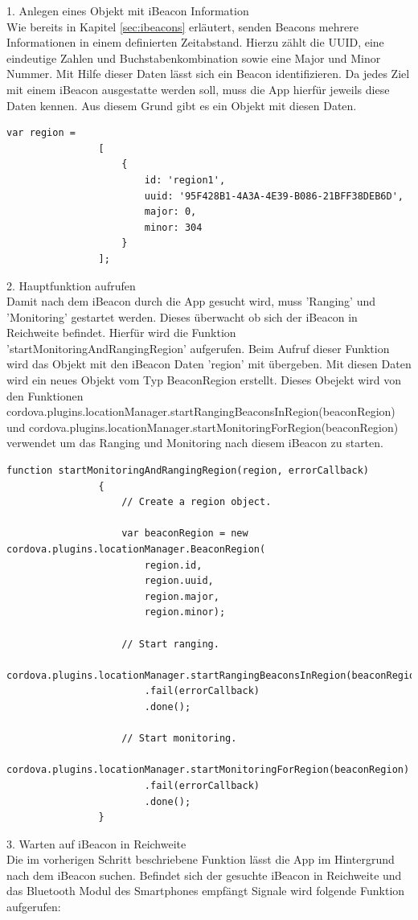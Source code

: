 1. Anlegen eines Objekt mit iBeacon Information
\\Wie bereits in Kapitel \ref{sec:ibeacons} erläutert, senden Beacons mehrere Informationen in einem definierten Zeitabstand. Hierzu zählt die UUID, eine eindeutige Zahlen und Buchstabenkombination sowie eine Major und Minor Nummer. Mit Hilfe dieser Daten lässt sich ein Beacon identifizieren. Da jedes Ziel mit einem iBeacon ausgestatte werden soll, muss die App hierfür jeweils diese Daten kennen. Aus diesem Grund gibt es ein Objekt mit diesen Daten.
 
\begin{lstlisting}
var region =
				[
					{
						id: 'region1',
						uuid: '95F428B1-4A3A-4E39-B086-21BFF38DEB6D',
						major: 0,
						minor: 304
					}
				];
\end{lstlisting}


2. Hauptfunktion aufrufen
\\Damit nach dem iBeacon durch die App gesucht wird, muss 'Ranging' und 'Monitoring' gestartet werden. Dieses überwacht ob sich der iBeacon in Reichweite befindet. Hierfür wird die Funktion 'startMonitoringAndRangingRegion' aufgerufen. Beim Aufruf dieser Funktion wird das Objekt mit den iBeacon Daten 'region' mit übergeben. Mit diesen Daten wird ein neues Objekt vom Typ BeaconRegion erstellt. Dieses Obejekt wird von den Funktionen  cordova.plugins.locationManager.startRangingBeaconsInRegion(beaconRegion) und cordova.plugins.locationManager.startMonitoringForRegion(beaconRegion) verwendet um das Ranging und Monitoring nach diesem iBeacon zu starten.

\begin{lstlisting}
function startMonitoringAndRangingRegion(region, errorCallback)
				{
					// Create a region object.
					
					var beaconRegion = new cordova.plugins.locationManager.BeaconRegion(
						region.id,
						region.uuid,
						region.major,
						region.minor);

					// Start ranging.
					cordova.plugins.locationManager.startRangingBeaconsInRegion(beaconRegion)
						.fail(errorCallback)
						.done();

					// Start monitoring.
					cordova.plugins.locationManager.startMonitoringForRegion(beaconRegion)
						.fail(errorCallback)
						.done();
				}
\end{lstlisting}


3. Warten auf iBeacon in Reichweite
\\Die im vorherigen Schritt beschriebene Funktion lässt die App im Hintergrund nach dem iBeacon suchen. Befindet sich der gesuchte iBeacon in Reichweite und das Bluetooth Modul des Smartphones empfängt Signale wird folgende Funktion aufgerufen:

